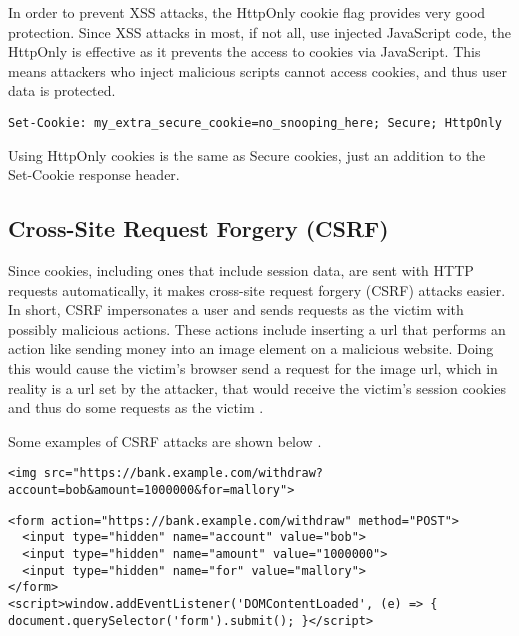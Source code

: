 \documentclass[conference,12pt]{IEEEtran}
\begin{document}
In order to prevent XSS attacks, the HttpOnly cookie flag provides very good
protection. Since XSS attacks in most, if not all, use injected JavaScript code,
the HttpOnly is effective as it prevents the access to cookies via JavaScript.
This means attackers who inject malicious scripts cannot access cookies, and
thus user data is protected.  

\begin{lstlisting}[caption={An example of server response header to set a Secure and HttpOnly cookie}]
Set-Cookie: my_extra_secure_cookie=no_snooping_here; Secure; HttpOnly
\end{lstlisting}

Using HttpOnly cookies is the same as Secure cookies, just an addition to the
Set-Cookie response header.

\subsection{Cross-Site Request Forgery (CSRF)}

Since cookies, including ones that include session data, are sent with HTTP
requests automatically, it makes cross-site request forgery (CSRF) attacks
easier. In short, CSRF impersonates a user and sends requests as the victim with
possibly malicious actions.  These actions include inserting a url that performs
an action like sending money into an image element on a malicious website.
Doing this would cause the victim’s browser send a request for the image url,
which in reality is a url set by the attacker, that would receive the victim’s
session cookies and thus do some requests as the victim \cite{b7}.

Some examples of CSRF attacks are shown below \cite{b8}.

\begin{lstlisting}[caption={CSRF implementation with a GET request}]
<img src="https://bank.example.com/withdraw?account=bob&amount=1000000&for=mallory">
\end{lstlisting}

\begin{lstlisting}[caption={CSRF implementation with a POST request and invisible form}]
<form action="https://bank.example.com/withdraw" method="POST">
  <input type="hidden" name="account" value="bob">
  <input type="hidden" name="amount" value="1000000">
  <input type="hidden" name="for" value="mallory">
</form>
<script>window.addEventListener('DOMContentLoaded', (e) => { document.querySelector('form').submit(); }</script>
\end{lstlisting}
\end{document}
